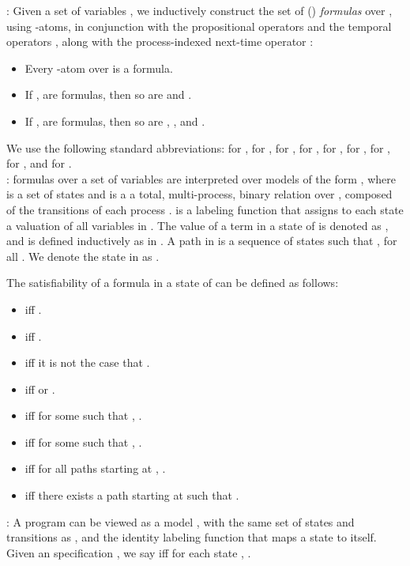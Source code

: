 : 
Given a set of variables , we inductively construct the set of (\vCTL) {\em formulas}
over , using -atoms, in conjunction with the
propositional operators  and the temporal operators
,
along with the process-indexed next-time operator :

\begin{itemize}
\item Every -atom over  is a formula. 
\item If ,  are formulas, then so are 
and . 
\item If ,  are formulas, then so are ,
,  and
.
\end{itemize}

We use the following standard abbreviations: 
for ,  for
,  for ,  for ,  for ,
 for
,  for ,  for , and  
for .\\

: \vCTL formulas over a set of variables 
are interpreted over models of the form , where  is
a set of states and  is a a total, multi-process, binary relation
 over , composed of the transitions  of 
each process .  is a labeling function that assigns to each
state  a valuation of all variables in .  The value of a
term  in a state  of  is denoted as ,
and is defined inductively as in . A path in  is a
sequence  of states such that , for all . We denote the  state in
 as . 



The satisfiability of a \vCTL formula in a state  of 
can be defined as follows:

\begin{itemize}
\item  iff  . 
\item  iff .
\item  iff it is not the case that .
\item  iff  or
.
\item  iff for some  such that  , . 
\item  iff for some  such that
, . 
\item  iff for all paths 
starting at , .
\item  iff there exists a path 
starting at  such that .\\
\end{itemize}



:
A program  can be viewed as a model , with
the same set of states and transitions as , and the identity labeling
function  that maps a state to itself. Given an 
specification , we say  iff for each state , . 



